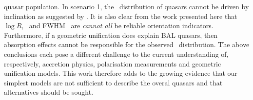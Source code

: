 quasar population. In scenario 1, the \ewo\ distribution of quasars cannot
be driven by inclination as suggested by \citep{risaliti2011}. 
It is also clear from the work presented here that $\log R$, \ewo\ and FWHM \hb\ 
are {\em cannot all} be reliable orientation indicators. 
Furthermore, if a geometric unification does explain BAL quasars, then 
absorption effects cannot be responsible for the observed \ewo\ distribution.
The above conclusions each pose a different challenge to the current
understanding of, respectively, accretion physics, polarisation measurements 
and geometric unification models. This work therefore adds to the
growing evidence that our simplest models are not sufficient to
describe the overal quasars and that alternatives should be sought.


